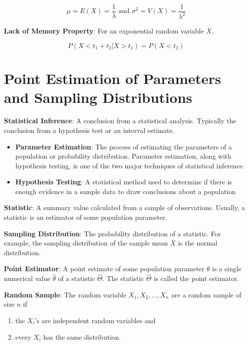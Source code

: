 \documentclass{article}
\begin{document}
\[\mu=E(X)=\frac{1}{\lambda}\text{ and }\sigma^2=V(X)=\frac{1}{\lambda^2}\]

\noindent\textbf{\color{red}Lack of Memory Property}: For an exponential random variable $X$,

\[P(X<t_1+t_2|X>t_1)=P(X<t_2)\]

\section{Point Estimation of Parameters and Sampling Distributions}

\noindent\textbf{\color{blue}Statistical Inference}: A conclusion from a statistical analysis. Typically the conclusion from a hypothesis test or an interval estimate.

\begin{itemize}
    \item \textbf{Parameter Estimation}: The process of estimating the parameters of a population or probability distribution. Parameter estimation, along with hypothesis testing, is one of the two major techniques of statistical inference.
    \item \textbf{Hypothesis Testing}: A statistical method used to determine if there is enough evidence in a sample data to draw conclusions about a population
\end{itemize}

\noindent\textbf{\color{blue}Statistic}: A summary value calculated from a sample of observations. Usually, a statistic is an estimator of some population parameter.

\noindent\textbf{\color{blue}Sampling Distribution}: The probability distribution of a statistic. For example, the sampling distribution of the sample mean $\bar{X}$ is the normal distribution.

\noindent\textbf{\color{blue}Point Estimator}: A point estimate of some population parameter $\theta$ is a single numerical value $\hat{\theta}$ of a statistic $\hat{\Theta}$. The statistic $\hat{\Theta}$ is called  the point estimator.

\noindent\textbf{\color{blue}Random Sample}: The random variable $X_1,X_2,\ldots,X_n$ are a random sample of size $n$ if

\begin{enumerate}[label=\alph*.]
    \item the $X_i$'s are independent random variables and
    \item every $X_i$ has the same distribution.
\end{enumerate}
\end{document}

